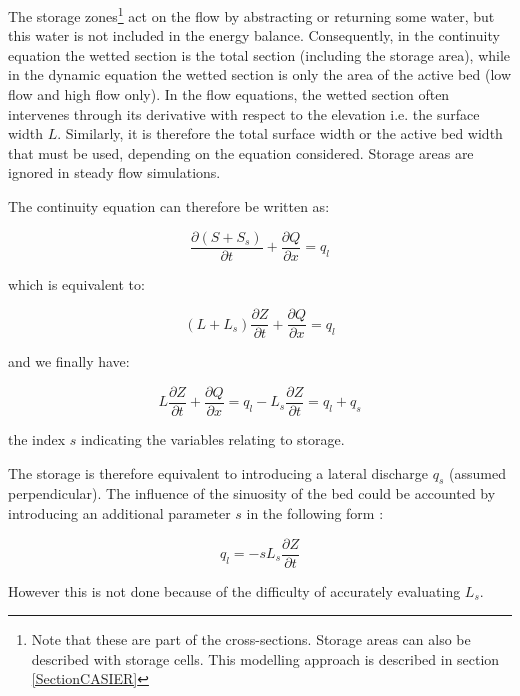 The storage zones\footnote{Note that these are part of the cross-sections. Storage areas can also be described with storage cells. This modelling approach is described in section \ref{SectionCASIER}}
act on the flow by abstracting or returning some water, but this water is not included in the energy balance. Consequently, in the continuity equation the wetted section is the total section (including the storage area), while in the dynamic equation the wetted section is only the area of the active bed (low flow and high flow only). In the flow equations, the wetted section often intervenes through its derivative with respect to the elevation i.e. the surface width $L$. Similarly, it is therefore the total surface width or the active bed width that must be used, depending on the equation considered.
Storage areas are ignored in steady flow simulations.

The continuity equation can therefore be written as:

\begin{equation}
  \frac{\partial{(S + S_s)}}{\partial t} + \frac{\partial Q}{\partial x} = q_l
\end{equation}

which is equivalent to:

\begin{equation}
  (L + L_s) \frac{\partial Z}{\partial t} + \frac{\partial Q}{\partial x} = q_l
\end{equation}

and we finally have:

\begin{equation}
  L \frac{\partial Z}{\partial t} + \frac{\partial Q}{\partial x} = q_l - L_s \frac{\partial Z}{\partial t} = q_l + q_s
\end{equation}

the index $s$ indicating the variables relating to storage.

The storage is therefore equivalent to introducing a lateral discharge $q_s$ (assumed perpendicular). The influence of the sinuosity of the bed could be accounted by introducing an additional parameter $s$ in the following form :

\begin{equation}
  q_l = - s L_s \frac{\partial Z}{\partial t}
\end{equation}

However this is not done because of the difficulty of accurately evaluating $L_s$.


